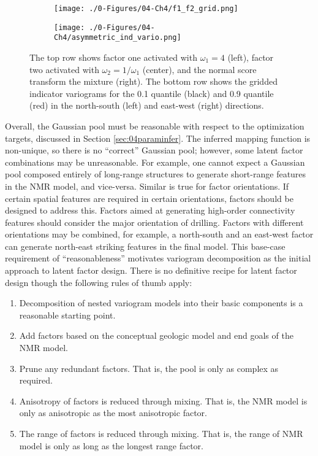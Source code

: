 \begin{figure}[!htb]
    \begin{subfigure}{1.0\textwidth}
        \centering
        \texttt{[image: ./0-Figures/04-Ch4/f1\_f2\_grid.png]}
    \end{subfigure}
    \begin{subfigure}{1.0\textwidth}
        \centering
        \texttt{[image: ./0-Figures/04-Ch4/asymmetric\_ind\_vario.png]}
    \end{subfigure}
    \caption{The top row shows factor one activated with $\omega_{1}=4$ (left), factor two activated with $\omega_{2}=1/\omega_{1}$ (center), and the normal score transform the mixture (right). The bottom row shows the gridded indicator variograms for the 0.1 quantile (black) and 0.9 quantile (red) in the north-south (left) and east-west (right) directions. }
    \label{fig:pool_asymmetry}
\end{figure}

Overall, the Gaussian pool must be reasonable with respect to the optimization targets, discussed in Section \ref{sec:04paraminfer}. The inferred mapping function is non-unique, so there is no ``correct'' Gaussian pool; however, some latent factor combinations may be unreasonable. For example, one cannot expect a Gaussian pool composed entirely of long-range structures to generate short-range features in the \gls{NMR} model, and vice-versa. Similar is true for factor orientations. If certain spatial features are required in certain orientations, factors should be designed to address this. Factors aimed at generating high-order connectivity features should consider the major orientation of drilling. Factors with different orientations may be combined, for example, a north-south and an east-west factor can generate north-east striking features in the final model. This base-case requirement of ``reasonableness'' motivates variogram decomposition as the initial approach to latent factor design. There is no definitive recipe for latent factor design though the following rules of thumb apply:
\begin{enumerate}[noitemsep]
    \item Decomposition of nested variogram models into their basic components   is a reasonable starting point.
    \item Add factors based on the conceptual geologic model and end goals of the \gls{NMR} model.
    \item Prune any redundant factors. That is, the pool is only as complex as required.
    \item Anisotropy of factors is reduced through mixing. That is, the \gls{NMR} model is only as anisotropic as the most anisotropic factor.
    \item The range of factors is reduced through mixing. That is, the range of \gls{NMR} model is only as long as the longest range factor.
\end{enumerate}


